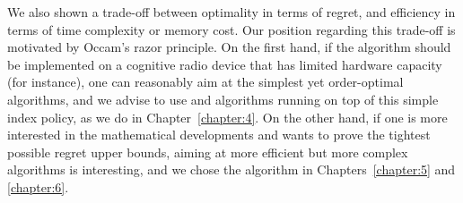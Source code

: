 We also shown a trade-off between optimality in terms of regret, and efficiency in terms of time complexity or memory cost.
Our position regarding this trade-off is motivated by Occam's razor principle.
On the first hand, if the algorithm should be implemented on a cognitive radio device that has limited hardware capacity (for instance),
one can reasonably aim at the simplest yet order-optimal algorithms, and we advise to use \UCB{} and algorithms running on top of this simple index policy, as we do in Chapter~\ref{chapter:4}.
On the other hand, if one is more interested in the mathematical developments and wants to prove the tightest possible regret upper bounds, aiming at more efficient but more complex algorithms is interesting, and we chose the \klUCB{} algorithm in Chapters~\ref{chapter:5} and \ref{chapter:6}.













